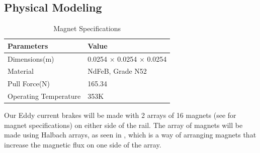 \documentclass[main.tex]{subfiles}
\begin{document}
    \subsection{Physical Modeling}
    \begin{table}
    	\centering
    	\begin{tabular}{ll} \toprule
            Parameters & Value\\ \midrule
            Dimensions(\si{m})     & 0.0254 $\times$ 0.0254 $\times$ 0.0254 \\
            Material     & NdFeB, Grade N52   \\
            Pull Force(\si{N})     & 165.34 \\
            Operating Temperature     & 353K  \\ \bottomrule
        \end{tabular}
        \caption{Magnet Specifications}
        \label{table:magnets}
    \end{table}
    Our Eddy current brakes will be made with 2 arrays of 16 magnets (see  for magnet specifications) on either side of the rail. The array of magnets will be made using Halbach arrays, as seen in , which is a way of arranging magnets that increase the magnetic flux on one side of the array.\\
\end{document}
